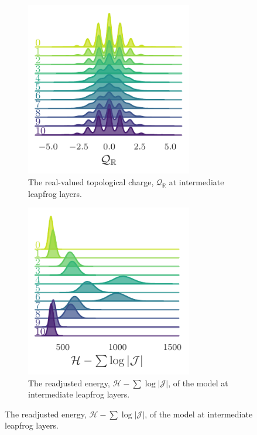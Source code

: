 \documentclass{article} %
\begin{document}
\begin{figure}[htpb]
\begin{subfigure}{0.32\textwidth}
      \centering
      \includegraphics[width=0.8\textwidth]{figures/sinQf_1755.pdf}
      \caption{\label{fig:sinQf}The real-valued topological charge, \(\mathcal{Q}_{\mathbb{R}}\) at intermediate leapfrog layers.}%
   \end{subfigure}
   \hfill
   \begin{subfigure}{0.32\textwidth}
      \centering
      \includegraphics[width=0.8\textwidth]{figures/extras/hwf.pdf}
      \caption{\label{fig:hwf}The readjusted energy, \(\mathcal{H}-\sum\log|\mathcal{J}|\), of the model at intermediate leapfrog layers.}
   \end{subfigure}
\end{figure}
%
\end{document}
